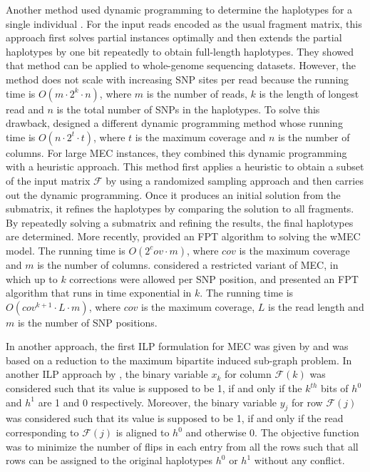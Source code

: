Another method used dynamic programming to determine the haplotypes for a single individual \citep{he2010optimal}. 
For the input reads encoded as the usual fragment matrix, this approach first solves partial instances optimally and then extends the partial haplotypes by one bit repeatedly to obtain full-length haplotypes. 
They showed that method can be applied to whole-genome sequencing datasets. However, the method does not scale with increasing SNP sites per read because 
the running time is $O(m \cdot 2^k \cdot n)$, where $m$ is the number of reads, $k$ is the length of longest read and $n$ is the total number of SNPs in the haplotypes.
To solve this drawback, \cite{deng2013highly} designed a different dynamic programming method whose running time is $O(n \cdot 2^t \cdot t)$, where $t$ is the maximum coverage and $n$ is the number of columns.
For large MEC instances, they combined this dynamic programming with a heuristic approach. 
This method first applies a heuristic to obtain a subset of the input matrix $\mathcal{F}$ by using a randomized sampling approach and then carries out the dynamic programming. 
Once it produces an initial solution from the submatrix, it refines the haplotypes by comparing the solution to all fragments. 
By repeatedly solving a submatrix and refining the results, the final haplotypes are determined.
More recently, \cite{Patterson2015} provided an FPT algorithm to solving the wMEC model. The running time is $O(2^cov \cdot m)$, where $cov$ is the maximum coverage and $m$ is the number of columns.
\cite{Pirola2015} considered a restricted variant of MEC, in which up to $k$ corrections were allowed per SNP position, 
and presented an FPT algorithm that runs in time exponential in $k$. The running time is $O(cov^{k+1} \cdot L \cdot m)$,
where $cov$  is the maximum coverage, $L$ is the read length and $m$ is the number of SNP positions.

In another approach, the first ILP formulation for MEC was given by \cite{Fouilhoux2012} and was based on a reduction to the maximum bipartite induced sub-graph problem. 
In another ILP approach by \cite{CDW13_exact}, the binary variable $x_k$ for column $\mathcal{F}(k)$ 
was considered such that its value is supposed to be 1, if and only if the $k^{th}$ bits of $h^0$ and $h^1$ are 1 and 0 respectively.
Moreover, the binary variable $y_j$ for row $\mathcal{F}(j)$ was considered such that its value is supposed to be 1, if and only 
if the read corresponding to $\mathcal{F}(j)$ is aligned to $h^0$ and otherwise 0.
The objective function was to minimize the number of flips in each entry from all the rows such that all rows can be assigned to the original haplotypes $h^0$ or $h^1$ without any conflict. 


